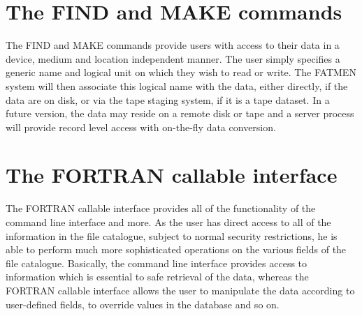\section{The FIND and MAKE commands}
\par
The FIND and MAKE commands provide users with access to their data
in a device, medium and location independent manner. The user simply
specifies a generic name and logical unit on which they wish to read
or write. The FATMEN system will then associate this logical name
with the data, either directly, if the data are on disk, or via
the tape staging system, if it is a tape dataset. In a future version,
the data may reside on a remote disk or tape and a server process
will provide record level access with on-the-fly data conversion.
\section{The FORTRAN callable interface}
\par
{}
The FORTRAN callable interface provides all of the functionality
of the command line interface and more. As the user has direct
access to all of the information in the file catalogue, subject
to normal security restrictions, he is able to perform much
more sophisticated operations on the various fields of the file
catalogue. Basically, the command line interface provides access
to information which is essential to safe retrieval of the data,
whereas the FORTRAN callable interface allows the user
to manipulate the data according to user-defined fields, to
override values in the database and so on.
